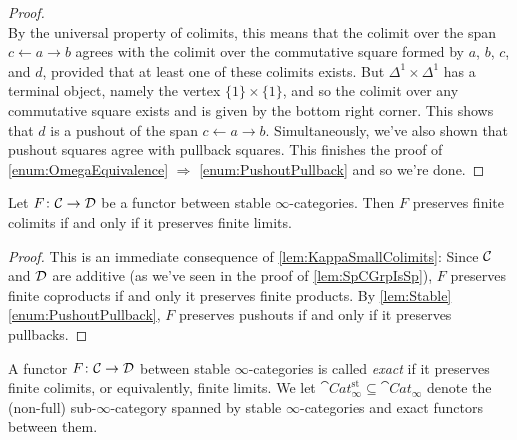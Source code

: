 \begin{proof}
\begin{equation*}
	\end{equation*}
	By the universal property of colimits, this means that the colimit over the span $c\leftarrow a\rightarrow b$ agrees with the colimit over the commutative square formed by $a$, $b$, $c$, and $d$, provided that at least one of these colimits exists. But $\Delta^1\times \Delta^1$ has a terminal object, namely the vertex $\{1\}\times\{1\}$, and so the colimit over any commutative square exists and is given by the bottom right corner. This shows that $d$ is a pushout of the span $c\leftarrow a\rightarrow b$. Simultaneously, we've also shown that pushout squares agree with pullback squares. This finishes the proof of \cref{enum:OmegaEquivalence} $\Rightarrow$ \cref{enum:PushoutPullback} and so we're done.
\end{proof}
\begin{cor}\label{cor:Exact}
	Let $F\colon \mathcal{C}\rightarrow\mathcal{D}$ be a functor between stable $\infty$-categories. Then $F$ preserves finite colimits if and only if it preserves finite limits.
\end{cor}
\begin{proof}
	This is an immediate consequence of \cref{lem:KappaSmallColimits}: Since $\mathcal{C}$ and $\mathcal{D}$ are additive (as we've seen in the proof of \cref{lem:SpCGrpIsSp}), $F$ preserves finite coproducts if and only it preserves finite products. By \cref{lem:Stable}\cref{enum:PushoutPullback}, $F$ preserves pushouts if and only if it preserves pullbacks.
\end{proof}

\begin{defi}\label{def:Exact}
	A functor $F\colon \mathcal{C}\rightarrow\mathcal{D}$ between stable $\infty$-categories is called \emph{exact} if it preserves finite colimits, or equivalently, finite limits. We let $\cat{Cat}_{\infty}^\mathrm{st}\subseteq\cat{Cat}_\infty$ denote the (non-full) sub-$\infty$-category spanned by stable $\infty$-categories and exact functors between them.
\end{defi}

